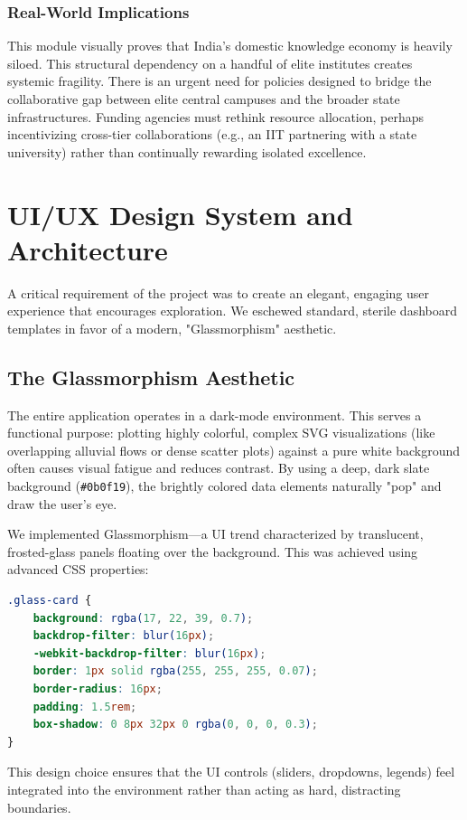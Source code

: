 \documentclass[12pt,a4paper]{article}
\begin{document}
\subsubsection{Real-World Implications}
This module visually proves that India's domestic knowledge economy is heavily siloed. This structural dependency on a handful of elite institutes creates systemic fragility. There is an urgent need for policies designed to bridge the collaborative gap between elite central campuses and the broader state infrastructures. Funding agencies must rethink resource allocation, perhaps incentivizing cross-tier collaborations (e.g., an IIT partnering with a state university) rather than continually rewarding isolated excellence.

\newpage
\section{UI/UX Design System and Architecture}
A critical requirement of the project was to create an elegant, engaging user experience that encourages exploration. We eschewed standard, sterile dashboard templates in favor of a modern, "Glassmorphism" aesthetic.

\subsection{The Glassmorphism Aesthetic}
The entire application operates in a dark-mode environment. This serves a functional purpose: plotting highly colorful, complex SVG visualizations (like overlapping alluvial flows or dense scatter plots) against a pure white background often causes visual fatigue and reduces contrast. By using a deep, dark slate background (\texttt{\#0b0f19}), the brightly colored data elements naturally "pop" and draw the user's eye.

We implemented Glassmorphism---a UI trend characterized by translucent, frosted-glass panels floating over the background. This was achieved using advanced CSS properties:
\begin{lstlisting}[language=CSS, caption=CSS snippet demonstrating the Glassmorphism card implementation.]
.glass-card {
    background: rgba(17, 22, 39, 0.7);
    backdrop-filter: blur(16px);
    -webkit-backdrop-filter: blur(16px);
    border: 1px solid rgba(255, 255, 255, 0.07);
    border-radius: 16px;
    padding: 1.5rem;
    box-shadow: 0 8px 32px 0 rgba(0, 0, 0, 0.3);
}
\end{lstlisting}
This design choice ensures that the UI controls (sliders, dropdowns, legends) feel integrated into the environment rather than acting as hard, distracting boundaries.
\end{document}
